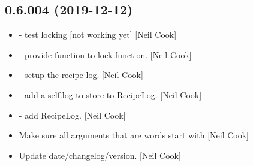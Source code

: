 \documentclass[a4paper,10pt,english]{report}
\begin{document}
\subsection{0.6.004 (2019-12-12)}
\label{\detokenize{misc/changelog:id14}}\begin{itemize}
\item {} 
 - test locking {[}not working yet{]} {[}Neil Cook{]}

\item {} 
 - provide function to lock function. {[}Neil Cook{]}

\item {} 
 - setup the recipe log. {[}Neil Cook{]}

\item {} 
 - add a self.log to store to RecipeLog. {[}Neil
Cook{]}

\item {} 
 - add RecipeLog. {[}Neil Cook{]}

\item {} 
Make sure all arguments that are words start with \textendash{} {[}Neil Cook{]}

\item {} 
Update date/changelog/version. {[}Neil Cook{]}

\end{itemize}
\end{document}
